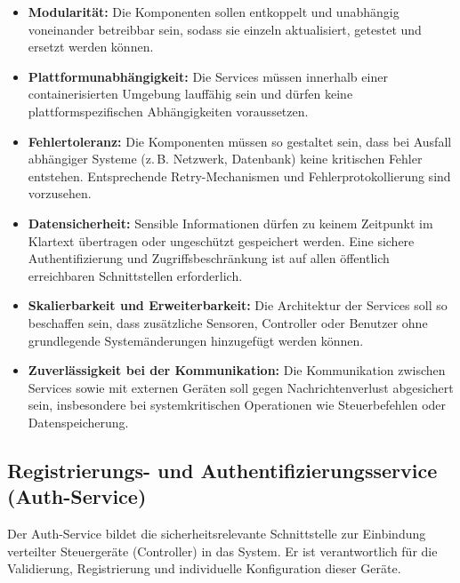 \begin{itemize}
  \item \textbf{Modularität:} Die Komponenten sollen entkoppelt und unabhängig voneinander betreibbar sein, sodass sie einzeln aktualisiert, getestet und ersetzt werden können.

  \item \textbf{Plattformunabhängigkeit:} Die Services müssen innerhalb einer containerisierten Umgebung lauffähig sein und dürfen keine plattformspezifischen Abhängigkeiten voraussetzen.

  \item \textbf{Fehlertoleranz:} Die Komponenten müssen so gestaltet sein, dass bei Ausfall abhängiger Systeme (z.\,B. Netzwerk, Datenbank) keine kritischen Fehler entstehen. Entsprechende Retry-Mechanismen und Fehlerprotokollierung sind vorzusehen.

  \item \textbf{Datensicherheit:} Sensible Informationen dürfen zu keinem Zeitpunkt im Klartext übertragen oder ungeschützt gespeichert werden. Eine sichere Authentifizierung und Zugriffsbeschränkung ist auf allen öffentlich erreichbaren Schnittstellen erforderlich.

  \item \textbf{Skalierbarkeit und Erweiterbarkeit:} Die Architektur der Services soll so beschaffen sein, dass zusätzliche Sensoren, Controller oder Benutzer ohne grundlegende Systemänderungen hinzugefügt werden können.

  \item \textbf{Zuverlässigkeit bei der Kommunikation:} Die Kommunikation zwischen Services sowie mit externen Geräten soll gegen Nachrichtenverlust abgesichert sein, insbesondere bei systemkritischen Operationen wie Steuerbefehlen oder Datenspeicherung.
\end{itemize}

\subsection{Registrierungs- und Authentifizierungsservice (Auth-Service)}

Der Auth-Service bildet die sicherheitsrelevante Schnittstelle zur Einbindung verteilter Steuergeräte (Controller) in das System. Er ist verantwortlich für die Validierung, Registrierung und individuelle Konfiguration dieser Geräte.

